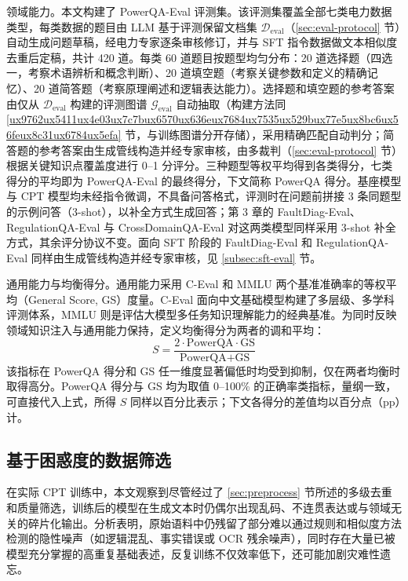 \documentclass[fontset=fandol,type=master,campus=shenzhen,etitleauto=true]{hithesisbook}
\begin{document}
领域能力。本文构建了 PowerQA-Eval 评测集。该评测集覆盖全部七类电力数据类型，每类数据的题目由 LLM 基于评测保留文档集 $\mathcal{D}_{\text{eval}}$（\ref{sec:eval-protocol} 节）自动生成问题草稿，经电力专家逐条审核修订，并与 SFT 指令数据做文本相似度去重后定稿，共计 420 道。每类 60 道题目按题型均匀分布：20 道选择题（四选一，考察术语辨析和概念判断）、20 道填空题（考察关键参数和定义的精确记忆）、20 道简答题（考察原理阐述和逻辑表达能力）。选择题和填空题的参考答案由仅从 $\mathcal{D}_{\text{eval}}$ 构建的评测图谱 $\mathcal{G}_{\text{eval}}$ 自动抽取（构建方法同 \ref{ux9762ux5411ux4e03ux7c7bux6570ux636eux7684ux7535ux529bux77e5ux8bc6ux56feux8c31ux6784ux5efa} 节，与训练图谱分开存储），采用精确匹配自动判分；简答题的参考答案由生成管线构造并经专家审核，由多裁判（\ref{sec:eval-protocol} 节）根据关键知识点覆盖度进行 0--1 分评分。三种题型等权平均得到各类得分，七类得分的平均即为 PowerQA-Eval 的最终得分，下文简称 PowerQA 得分。基座模型与 CPT 模型均未经指令微调，不具备问答格式，评测时在问题前拼接 3 条同题型的示例问答（3-shot），以补全方式生成回答；第 3 章的 FaultDiag-Eval、RegulationQA-Eval 与 CrossDomainQA-Eval 对这两类模型同样采用 3-shot 补全方式，其余评分协议不变。面向 SFT 阶段的 FaultDiag-Eval 和 RegulationQA-Eval 同样由生成管线构造并经专家审核，见 \ref{subsec:sft-eval} 节。

通用能力与均衡得分。通用能力采用 C-Eval 和 MMLU 两个基准准确率的等权平均（General Score, GS）度量。C-Eval 面向中文基础模型构建了多层级、多学科评测体系\cite{ref66}，MMLU 则是评估大模型多任务知识理解能力的经典基准\cite{ref67}。为同时反映领域知识注入与通用能力保持，定义均衡得分为两者的调和平均：
\begin{equation}
S = \frac{2 \cdot \text{PowerQA} \cdot \text{GS}}{\text{PowerQA} + \text{GS}}
\end{equation}
该指标在 PowerQA 得分和 GS 任一维度显著偏低时均受到抑制，仅在两者均衡时取得高分。PowerQA 得分与 GS 均为取值 0--100\% 的正确率类指标，量纲一致，可直接代入上式，所得 $S$ 同样以百分比表示；下文各得分的差值均以百分点（pp）计。

\subsection{基于困惑度的数据筛选}\label{ux57faux4e8eux56f0ux60d1ux5ea6ux7684ux6570ux636eux7b5bux9009}

在实际 CPT 训练中，本文观察到尽管经过了 \ref{sec:preprocess} 节所述的多级去重和质量筛选，训练后的模型在生成文本时仍偶尔出现乱码、不连贯表达或与领域无关的碎片化输出。分析表明，原始语料中仍残留了部分难以通过规则和相似度方法检测的隐性噪声（如逻辑混乱、事实错误或 OCR 残余噪声），同时存在大量已被模型充分掌握的高重复基础表述，反复训练不仅效率低下，还可能加剧灾难性遗忘。
\end{document}

